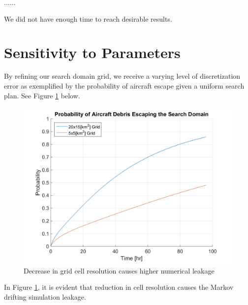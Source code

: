 \documentclass[12pt, letterpaper]{article}  %
\theoremstyle{definition}
\theoremstyle{remark}
\theoremstyle{plain}
\begin{document}
......

We did not have enough time to reach desirable results.




\section{Sensitivity to Parameters}\label{sec:sensitive}


By refining our search domain grid, we receive a varying level of discretization error as exemplified by the probability of aircraft escape given a uniform search plan. See Figure \ref{fig:NoSearchEscapeExplain} below.

\begin{center}
	\begin{figure}[H]
		\centering
		\includegraphics[width=0.8\linewidth]{figures/NoSearchEscapeExplain}
		\caption{Decrease in grid cell resolution causes higher numerical leakage}
		\label{fig:NoSearchEscapeExplain}
	\end{figure}
\end{center}

In Figure \ref{fig:NoSearchEscapeExplain}, it is evident that reduction in cell resolution causes the Markov drifting simulation leakage.


\end{document}
